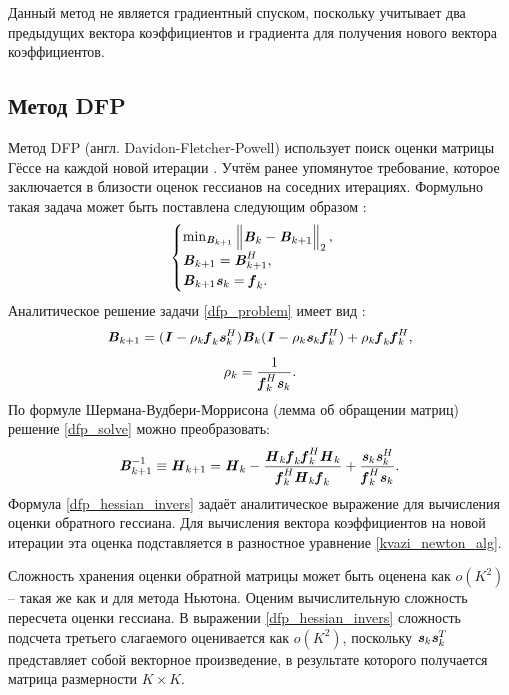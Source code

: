 Данный метод не является градиентный спуском, поскольку учитывает два предыдущих вектора коэффициентов и градиента для получения нового вектора коэффициентов.
\subsection{Метод DFP} \label{subsec:quasi_newton_dfp}
Метод DFP (англ. Davidon-Fletcher-Powell) использует поиск оценки матрицы Гёссе на каждой новой итерации \cite{pract_optimiz}. Учтём ранее упомянутое требование, которое заключается в близости оценок гессианов на соседних итерациях. Формульно такая задача может быть поставлена следующим образом \cite{pract_optimiz}:
\begin{equation}
	\begin{cases}
		\min_{\textbf{\textit{B}}_{k+1}}
		\begin{Vmatrix}
			\textbf{\textit{B}}_{k}-\textbf{\textit{B}}_{k+1}
		\end{Vmatrix}_2,\\
		\textbf{\textit{B}}_{k+1}=\textbf{\textit{B}}_{k+1}^H,\\
		\textbf{\textit{B}}_{k+1}\textbf{\textit{s}}_{k}=\textbf{\textit{f}}_{k}.
	\end{cases}
	\label{dfp_problem}
\end{equation}
Аналитическое решение задачи \eqref{dfp_problem} имеет вид \cite{fletcher}:
\begin{equation}
	\textbf{\textit{B}}_{k+1}=(\textbf{\textit{I}}-\rho_{k}\textbf{\textit{f}}_{k}\textbf{\textit{s}}_{k}^H)
	\textbf{\textit{B}}_{k}(\textbf{\textit{I}}-\rho_{k}\textbf{\textit{s}}_{k}\textbf{\textit{f}}_{k}^H)+\rho_{k}\textbf{\textit{f}}_{k}\textbf{\textit{f}}_{k}^H,
	\label{dfp_solve}
\end{equation}
\begin{equation}
	\rho_{k}=\frac{1}{\textbf{\textit{f}}_{k}^H\textbf{\textit{s}}_{k}}.
	\label{dfp_solve_rho}
\end{equation}
По формуле Шермана-Вудбери-Моррисона \cite{matrix_calc} (лемма об обращении матриц) решение \eqref{dfp_solve} можно преобразовать:
\begin{equation}
	\textbf{\textit{B}}_{k+1}^{-1}\equiv\textbf{\textit{H}}_{k+1}=\textbf{\textit{H}}_{k}-
	\frac{\textbf{\textit{H}}_{k}\textbf{\textit{f}}_{k}\textbf{\textit{f}}_{k}^H\textbf{\textit{H}}_{k}}{\textbf{\textit{f}}_{k}^H\textbf{\textit{H}}_{k}\textbf{\textit{f}}_{k}}+
	\frac{\textbf{\textit{s}}_{k}\textbf{\textit{s}}_{k}^H}{\textbf{\textit{f}}_{k}^H\textbf{\textit{s}}_{k}}.
	\label{dfp_hessian_invers}
\end{equation}
Формула \eqref{dfp_hessian_invers} задаёт аналитическое выражение для вычисления оценки обратного гессиана. Для вычисления вектора коэффициентов на новой итерации эта оценка подставляется в разностное уравнение \eqref{kvazi_newton_alg}.

Сложность хранения оценки обратной матрицы может быть оценена как $o(K^2)$ -- такая же как и для метода Ньютона. Оценим вычислительную сложность пересчета оценки гессиана. В выражении \eqref{dfp_hessian_invers} сложность подсчета третьего слагаемого оценивается как $o(K^2)$, поскольку $\textbf{\textit{s}}_{k}\textbf{\textit{s}}_{k}^T$ представляет собой векторное произведение, в результате которого получается матрица размерности $K\times K$.

